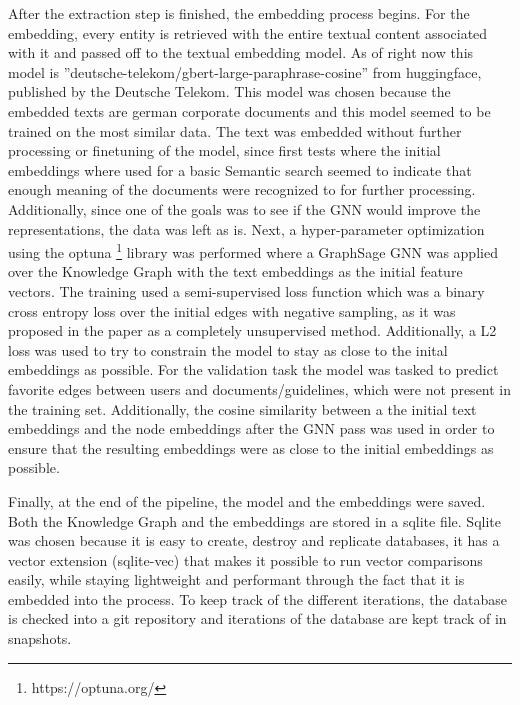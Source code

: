 \documentclass[draft,final]{vutinfth} %
\begin{document}
After the extraction step is finished, the embedding process begins. For the embedding, every entity is retrieved with the entire textual content associated with it and passed off to the textual embedding model. As of right now this model is ''deutsche-telekom/gbert-large-paraphrase-cosine'' from huggingface, published by the Deutsche Telekom.\cite{german_bert} This model was chosen because the embedded texts are german corporate documents and this model seemed to be trained on the most similar data. The text was embedded without further processing or finetuning of the model,  since first tests where the initial embeddings where used for a basic Semantic search seemed to indicate that enough meaning of the documents were recognized to for further processing. Additionally, since one of the goals was to see if the GNN would improve the representations, the data was left as is. Next, a hyper-parameter optimization using the optuna \footnote{https://optuna.org/} library was performed where a GraphSage GNN was applied over the Knowledge Graph with the text embeddings as the initial feature vectors. The training used a semi-supervised loss function which was a binary cross entropy loss over the initial edges with negative sampling, as it was proposed in the paper as a completely unsupervised method. Additionally, a L2 loss was used to try to constrain the model to stay as close to the inital embeddings as possible. For the validation task the model was tasked to predict favorite edges between users and documents/guidelines, which were not present in the training set. Additionally, the cosine similarity between a the initial text embeddings and the node embeddings after the GNN pass was used in order to ensure that the resulting embeddings were as close to the initial embeddings as possible. 

Finally, at the end of the pipeline, the model and the embeddings were saved. Both the Knowledge Graph and the embeddings are stored in a sqlite file. Sqlite was chosen because it is easy to create, destroy and replicate databases, it has a vector extension (sqlite-vec) that makes it possible to run vector comparisons easily, while staying lightweight and performant through the fact that it is embedded into the process. To keep track of the different iterations, the database is checked into a git repository and iterations of the database are kept track of in snapshots.
\end{document}

